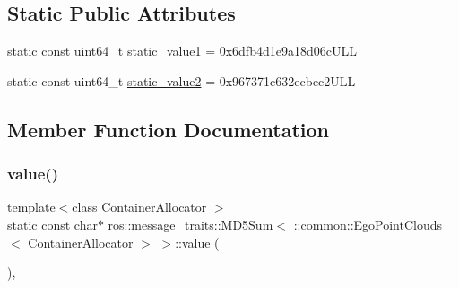 \subsection*{Static Public Attributes}
\begin{DoxyCompactItemize}
\item 
static const uint64\+\_\+t \hyperlink{structros_1_1message__traits_1_1MD5Sum_3_01_1_1common_1_1EgoPointClouds___3_01ContainerAllocator_01_4_01_4_ac67e73115660c8f3cd2f4f1e5280bc83}{static\+\_\+value1} = 0x6dfb4d1e9a18d06c\+U\+LL
\item 
static const uint64\+\_\+t \hyperlink{structros_1_1message__traits_1_1MD5Sum_3_01_1_1common_1_1EgoPointClouds___3_01ContainerAllocator_01_4_01_4_a9f0daec33ee8f913f2eec92f30b86b16}{static\+\_\+value2} = 0x967371c632ecbec2\+U\+LL
\end{DoxyCompactItemize}


\subsection{Member Function Documentation}
\mbox{\label{structros_1_1message__traits_1_1MD5Sum_3_01_1_1common_1_1EgoPointClouds___3_01ContainerAllocator_01_4_01_4_a43f333543bc9747769fc141be6c2b8ae}} 
\subsubsection{\texorpdfstring{value()}{value()}\hspace{0.1cm}{\footnotesize\ttfamily [1/2]}}
{\footnotesize\ttfamily template$<$class Container\+Allocator $>$ \\
static const char$\ast$ ros\+::message\+\_\+traits\+::\+M\+D5\+Sum$<$ \+::\hyperlink{structcommon_1_1EgoPointClouds__}{common\+::\+Ego\+Point\+Clouds\+\_\+}$<$ Container\+Allocator $>$ $>$\+::value (\begin{DoxyParamCaption}{ }\end{DoxyParamCaption})\hspace{0.3cm}{\ttfamily [inline]}, {\ttfamily [static]}}

